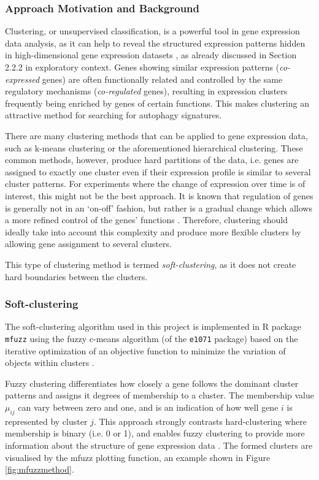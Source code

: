  
\subsubsection{Approach Motivation and Background}
Clustering, or unsupervised classification,  is a powerful tool in gene expression data analysis, as it can help to reveal the structured expression patterns hidden in high-dimensional gene expression datasets \cite{Kumar2007Mfuzz:Data}, as already discussed in Section 2.2.2 in exploratory context. Genes showing similar expression patterns (\textit{co-expressed} genes) are often functionally related and controlled by the same regulatory mechanisms (\textit{co-regulated} genes), resulting in expression clusters frequently being enriched by genes of certain functions. This makes clustering an attractive method for searching for autophagy signatures. 
 
There are many clustering methods that can be applied to gene expression data, such as k-means clustering or the aforementioned hierarchical clustering. These common methods, however, produce hard partitions of the data, i.e. genes are assigned to exactly one cluster even if their expression profile is similar to several cluster patterns. For experiments where the change of expression over time is of interest, this might not be the best approach. It is known that regulation of genes is generally not in an `on-off' fashion, but rather is a gradual change which allows a more refined control of the genes' functions  \cite{Kumar2007Mfuzz:Data}. Therefore, clustering should ideally take into account this complexity and produce more flexible clusters by allowing gene assignment to several clusters.
 
This type of clustering method is termed \textit{soft-clustering}, as it does not  create hard boundaries between the clusters. 
 
\subsubsection{Soft-clustering}
 
The soft-clustering algorithm used in this project is implemented in R package \texttt{mfuzz} \cite{Kumar2007Mfuzz:Data}  using the fuzzy c-means algorithm (of the \texttt{e1071} package) based on the iterative optimization of an
objective function to minimize the variation of objects within clusters  \cite{Bezdek1981PatternAlgorithms}.
 
Fuzzy clustering differentiates how closely a gene follows the dominant cluster patterns and assigns it degrees of membership to a cluster. The membership value $\mu_{ij}$ can vary between zero and one, and is an indication of how well gene $i$ is represented by cluster $j$. This approach strongly contrasts hard-clustering where membership is binary (i.e. 0 or 1), and enables fuzzy clustering to provide more information about the structure of gene expression data \cite{Kumar2007Mfuzz:Data}. 
The formed clusters are visualised by the mfuzz plotting function, an example shown in Figure \ref{fig:mfuzzmethod}. 

